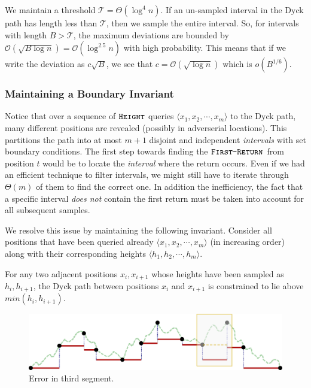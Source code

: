 We maintain a threshold $\mathcal T = \Theta(\log^4 n)$.
If an un-sampled interval in the Dyck path has length less than $\mathcal T$, then we sample the entire interval.
So, for intervals with length $B > \mathcal T$,
the maximum deviations are bounded by $\mathcal O(\sqrt{B\log n}) = \mathcal O(\log^{2.5}n)$ with high probability.
This means that if we write the deviation as $c\sqrt B$, we see that $c = \mathcal O(\sqrt{\log n})$ which is $o(B^{1/6})$.


\subsubsection{Maintaining a Boundary Invariant}%
\label{sec:maintaining_a_boundary_invariant}
Notice that over a sequence of $\texttt{\textsc{Height}}$ queries $\langle x_1, x_2,\cdots, x_m \rangle$ to the Dyck path,
many different positions are revealed (possibly in adverserial locations).
This partitions the path into at most $m+1$ disjoint and independent \emph{intervals} with set boundary conditions.
The first step towards finding the $\texttt{\textsc{First-Return}}$ from position $t$ would be to locate the \emph{interval} where the return occurs.
Even if we had an efficient technique to filter intervals, we might still have to iterate through $\Theta(m)$ of them to find the correct one.
In addition the inefficiency, the fact that a specific interval \emph{does not} contain the first return
must be taken into account for all subsequent samples.

We resolve this issue by maintaining the following invariant.
Consider all positions that have been queried already $ \langle x_1, x_2,\cdots, x_m \rangle$ (in increasing order)
along with their corresponding heights $ \langle h_1, h_2,\cdots, h_m \rangle$.
\begin{proposition}
\label{prop:boundary_invariant}
For any two adjacent positions $x_i,x_{i+1}$ whose heights have been sampled as $h_i, h_{i+1}$,
the Dyck path between positions $x_i$ and $x_{i+1}$ is constrained to lie above $min(h_i, h_{i+1})$.
\end{proposition}
\begin{figure}[htpb]
    \centering
    \includegraphics[width=\textwidth]{images/dyck_boundary_invariant.pdf}
    \caption{Error in third segment.}
    \label{fig:dyck_boundary_invariant}
\end{figure}

